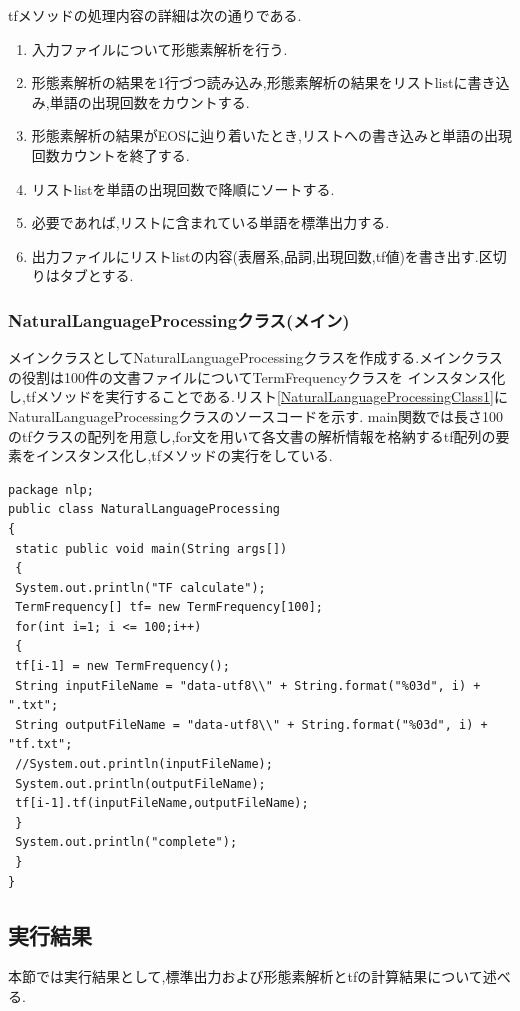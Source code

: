 \documentclass[a4j]{jarticle}
\begin{document}
  tfメソッドの処理内容の詳細は次の通りである.
  \begin{enumerate}
    \item 入力ファイルについて形態素解析を行う.
    \item 形態素解析の結果を1行づつ読み込み,形態素解析の結果をリストlistに書き込み,単語の出現回数をカウントする.
    \item 形態素解析の結果がEOSに辿り着いたとき,リストへの書き込みと単語の出現回数カウントを終了する.
    \item リストlistを単語の出現回数で降順にソートする.
    \item 必要であれば,リストに含まれている単語を標準出力する.
    \item 出力ファイルにリストlistの内容(表層系,品詞,出現回数,tf値)を書き出す.区切りはタブとする.
  \end{enumerate}

\subsubsection{NaturalLanguageProcessingクラス(メイン)}
メインクラスとしてNaturalLanguageProcessingクラスを作成する.メインクラスの役割は100件の文書ファイルについてTermFrequencyクラスを
インスタンス化し,tfメソッドを実行することである.リスト\ref{NaturalLanguageProcessingClass1}にNaturalLanguageProcessingクラスのソースコードを示す.
main関数では長さ100のtfクラスの配列を用意し,for文を用いて各文書の解析情報を格納するtf配列の要素をインスタンス化し,tfメソッドの実行をしている.
\begin{lstlisting}[basicstyle=\ttfamily\footnotesize, frame=single,label=NaturalLanguageProcessingClass1,caption=NaturalLanguageProcessingクラスのソースコード]
package nlp;
public class NaturalLanguageProcessing
{
 static public void main(String args[])
 {
 System.out.println("TF calculate");
 TermFrequency[] tf= new TermFrequency[100];
 for(int i=1; i <= 100;i++)
 {
 tf[i-1] = new TermFrequency();
 String inputFileName = "data-utf8\\" + String.format("%03d", i) + ".txt";
 String outputFileName = "data-utf8\\" + String.format("%03d", i) + "tf.txt";
 //System.out.println(inputFileName);
 System.out.println(outputFileName);
 tf[i-1].tf(inputFileName,outputFileName);
 }
 System.out.println("complete");
 }
}

\end{lstlisting}

\subsection{実行結果}
本節では実行結果として,標準出力および形態素解析とtfの計算結果について述べる.
\end{document}
